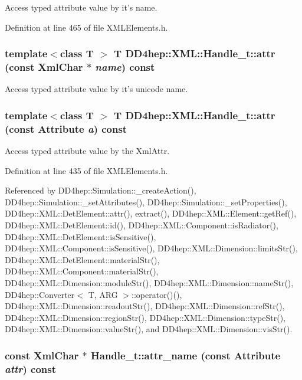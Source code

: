 Access typed attribute value by it's name. 

Definition at line 465 of file XMLElements.h.\hypertarget{class_d_d4hep_1_1_x_m_l_1_1_handle__t_abc9305bc2e0453a021dc9ef9d119843d}{
\subsubsection[{attr}]{\setlength{\rightskip}{0pt plus 5cm}template$<$class T $>$ {\bf T} DD4hep::XML::Handle\_\-t::attr (const {\bf XmlChar} $\ast$ {\em name}) const}}
\label{class_d_d4hep_1_1_x_m_l_1_1_handle__t_abc9305bc2e0453a021dc9ef9d119843d}


Access typed attribute value by it's unicode name. \hypertarget{class_d_d4hep_1_1_x_m_l_1_1_handle__t_ae00b87295308c1b4d342cb7be2eb0679}{
\subsubsection[{attr}]{\setlength{\rightskip}{0pt plus 5cm}template$<$class T $>$ {\bf T} DD4hep::XML::Handle\_\-t::attr (const {\bf Attribute} {\em a}) const}}
\label{class_d_d4hep_1_1_x_m_l_1_1_handle__t_ae00b87295308c1b4d342cb7be2eb0679}


Access typed attribute value by the XmlAttr. 

Definition at line 435 of file XMLElements.h.

Referenced by DD4hep::Simulation::\_\-createAction(), DD4hep::Simulation::\_\-setAttributes(), DD4hep::Simulation::\_\-setProperties(), DD4hep::XML::DetElement::attr(), extract(), DD4hep::XML::Element::getRef(), DD4hep::XML::DetElement::id(), DD4hep::XML::Component::isRadiator(), DD4hep::XML::DetElement::isSensitive(), DD4hep::XML::Component::isSensitive(), DD4hep::XML::Dimension::limitsStr(), DD4hep::XML::DetElement::materialStr(), DD4hep::XML::Component::materialStr(), DD4hep::XML::Dimension::moduleStr(), DD4hep::XML::Dimension::nameStr(), DD4hep::Converter$<$ T, ARG $>$::operator()(), DD4hep::XML::Dimension::readoutStr(), DD4hep::XML::Dimension::refStr(), DD4hep::XML::Dimension::regionStr(), DD4hep::XML::Dimension::typeStr(), DD4hep::XML::Dimension::valueStr(), and DD4hep::XML::Dimension::visStr().\hypertarget{class_d_d4hep_1_1_x_m_l_1_1_handle__t_aacd63b52439de83725269fc810d1f531}{
\subsubsection[{attr\_\-name}]{\setlength{\rightskip}{0pt plus 5cm}const {\bf XmlChar} $\ast$ Handle\_\-t::attr\_\-name (const {\bf Attribute} {\em attr}) const}}
\label{class_d_d4hep_1_1_x_m_l_1_1_handle__t_aacd63b52439de83725269fc810d1f531}


